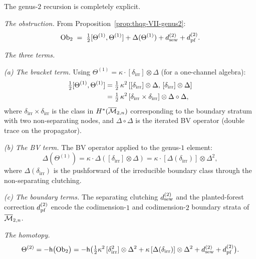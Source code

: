 \begin{computation}
The genus-$2$ recursion is completely explicit.

\medskip\noindent\emph{The obstruction.}
From Proposition~\ref{prop:thqg-VII-genus2}:
\begin{equation}%
\Ob_2
\;=\;
\tfrac{1}{2}[\Theta^{(1)},\Theta^{(1)}]
+ \Delta(\Theta^{(1)})
+ \dsew^{(2)} + \dpf^{(2)}.
\end{equation}

\medskip\noindent\emph{The three terms.}

\emph{(a) The bracket term.} Using
$\Theta^{(1)} = \kappa \cdot [\delta_{\mathrm{irr}}]
\otimes \Delta$ (for a one-channel algebra):
\begin{align}
\tfrac{1}{2}[\Theta^{(1)},\Theta^{(1)}]
&= \tfrac{1}{2}\,\kappa^2\,
 [[\delta_{\mathrm{irr}}] \otimes \Delta,\,
 [\delta_{\mathrm{irr}}] \otimes \Delta]
\notag\\
&= \tfrac{1}{2}\,\kappa^2\,
 [\delta_{\mathrm{irr}} \times \delta_{\mathrm{irr}}]
 \otimes \Delta \circ \Delta,
\end{align}
where $\delta_{\mathrm{irr}} \times \delta_{\mathrm{irr}}$
is the class in $H^*(\overline{\mathcal{M}}_{2,n})$ corresponding to the
boundary stratum with two non-separating nodes, and
$\Delta \circ \Delta$ is the iterated BV operator (double
trace on the propagator).

\emph{(b) The BV term.} The BV operator applied to the genus-$1$
element:
\begin{equation}%
\Delta(\Theta^{(1)})
= \kappa \cdot \Delta([\delta_{\mathrm{irr}}] \otimes \Delta)
= \kappa \cdot [\Delta(\delta_{\mathrm{irr}})]
 \otimes \Delta^2,
\end{equation}
where $\Delta(\delta_{\mathrm{irr}})$ is the pushforward of
the irreducible boundary class through the non-separating
clutching.

\emph{(c) The boundary terms.} The separating clutching
$d_{\mathrm{sew}}^{(2)}$ and the planted-forest correction $d_{\mathrm{pf}}^{(2)}$
encode the codimension-$1$ and codimension-$2$ boundary strata
of $\overline{\mathcal{M}}_{2,n}$.

\medskip\noindent\emph{The homotopy.}
\begin{equation}%
\Theta^{(2)}
= -\hCont\bigl(\Ob_2\bigr)
= -\hCont\bigl(
 \tfrac{1}{2}\kappa^2\,
 [\delta_{\mathrm{irr}}^2] \otimes \Delta^2
 + \kappa\,[\Delta(\delta_{\mathrm{irr}})]
 \otimes \Delta^2
 + \dsew^{(2)} + \dpf^{(2)}
 \bigr).
\end{equation}


\end{computation}
